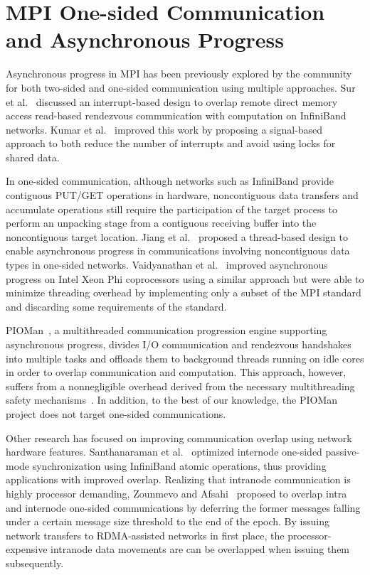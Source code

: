 \section{MPI One-sided Communication and Asynchronous Progress}\label{sec:related-casper}

Asynchronous progress in MPI has been previously explored by the
community for both two-sided and one-sided communication using
multiple approaches.  Sur et al.~\cite{async-rdmaread} discussed an
interrupt-based design to overlap remote direct memory access
read-based rendezvous communication with computation on InfiniBand
networks.  Kumar et al.~\cite{async-p2p} improved this work by proposing a
signal-based approach to both reduce the number of interrupts and
avoid using locks for shared data.

In one-sided communication, although networks such as InfiniBand
provide contiguous PUT\slash GET operations in hardware, noncontiguous
data transfers and accumulate operations still require the
participation of the target process to perform an unpacking stage from
a contiguous receiving buffer into the noncontiguous target location.
Jiang et al.~\cite{mpi2-thread} proposed a thread-based design to enable
asynchronous progress in communications involving noncontiguous data
types in one-sided networks.  Vaidyanathan et al.~\cite{async-ipdps2014}
improved asynchronous progress on Intel Xeon Phi coprocessors using a
similar approach but were able to minimize threading overhead by
implementing only a subset of the MPI standard and discarding some
requirements of the standard.

PIOMan~\cite{pioman-task}, a multithreaded communication progression
engine supporting asynchronous progress, divides I/O communication and
rendezvous handshakes into multiple tasks and offloads them to
background threads running on idle cores in order to overlap
communication and computation.  This approach, however, suffers from a
nonnegligible overhead derived from the necessary multithreading
safety mechanisms~\cite{pioman-mt-overhead}.  In addition, to the best
of our knowledge, the PIOMan project does not target one-sided
communications.

Other research has focused on improving communication overlap using
network hardware features.  Santhanaraman et al.~\cite{mva-true-oneside}
optimized internode one-sided passive-mode synchronization using
InfiniBand atomic operations, thus providing applications with improved
overlap.  Realizing that intranode communication is highly processor
demanding, Zounmevo and Afsahi~\cite{zounmevo2014intra} proposed to overlap intra and
internode one-sided communications by deferring the former messages
falling under a certain message size threshold to the end of the
epoch.  By issuing network transfers to RDMA-assisted networks in
first place, the processor-expensive intranode data movements are can
be overlapped when issuing them subsequently.

